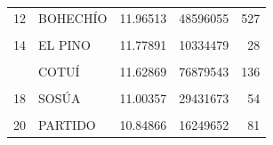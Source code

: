 \documentclass[10pt,landscape,a3paper]{article}
\begin{document}
\begin{table}[H]
\begin{tabular}[t]{llrrr}
12 & BOHECHÍO & 11.96513 & 48596055 & 527\\
\cellcolor{lightgray}{13} & \cellcolor{lightgray}{RESTAURACIÓN} & \cellcolor{lightgray}{11.95832} & \cellcolor{lightgray}{33003809} & \cellcolor{lightgray}{203}\\
14 & EL PINO & 11.77891 & 10334479 & 28\\
\cellcolor{lightgray}{15} & \cellcolor{lightgray}{LAS MATAS DE SANTA CRUZ} & \cellcolor{lightgray}{11.74594} & \cellcolor{lightgray}{8424526} & \cellcolor{lightgray}{27}\\
\addlinespace
16 & COTUÍ & 11.62869 & 76879543 & 136\\
\cellcolor{lightgray}{17} & \cellcolor{lightgray}{PEDRO BRAND} & \cellcolor{lightgray}{11.51339} & \cellcolor{lightgray}{25532014} & \cellcolor{lightgray}{132}\\
18 & SOSÚA & 11.00357 & 29431673 & 54\\
\cellcolor{lightgray}{19} & \cellcolor{lightgray}{PEDRO SANTANA} & \cellcolor{lightgray}{10.95457} & \cellcolor{lightgray}{60055728} & \cellcolor{lightgray}{430}\\
20 & PARTIDO & 10.84866 & 16249652 & 81\\
\bottomrule
\end{tabular}
\end{table}
\end{document}
